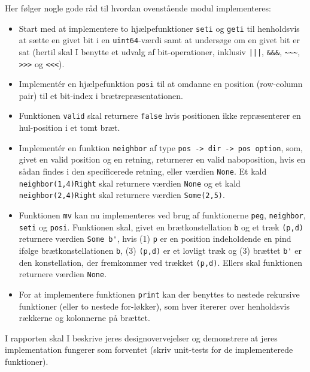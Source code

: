 Her følger nogle gode råd til hvordan ovenstående modul implementeres:
\begin{itemize}

\item Start med at implementere to hjælpefunktioner \lstinline{seti} og \lstinline{geti} til henholdsvis at sætte en givet bit i en \lstinline{uint64}-værdi samt at undersøge om en givet bit er sat (hertil skal I benytte et udvalg af bit-operationer, inklusiv \lstinline{|||}, \lstinline{&&&}, \lstinline{~~~}, \lstinline{>>>} og \lstinline{<<<}).

\item Implementér en hjælpefunktion \lstinline{posi} til at omdanne en position (row-column pair) til et bit-index i brætrepræsentationen.

\item Funktionen \lstinline{valid} skal returnere \lstinline{false} hvis positionen ikke repræsenterer en hul-position i et tomt bræt.
\item Implementér en funktion \lstinline{neighbor} af type \lstinline{pos -> dir -> pos option}, som, givet en valid position og en retning, returnerer en valid naboposition, hvis en sådan findes i den specificerede retning, eller værdien \lstinline{None}. Et kald \lstinline{neighbor(1,4)Right} skal returnere værdien \lstinline{None} og et kald \lstinline{neighbor(2,4)Right} skal returnere værdien \lstinline{Some(2,5)}.
\item Funktionen \lstinline{mv} kan nu implementeres ved brug af funktionerne \lstinline{peg}, \lstinline{neighbor}, \lstinline{seti} og \lstinline{posi}. Funktionen skal, givet en brætkonstellation \lstinline{b} og et træk \lstinline{(p,d)} returnere værdien \lstinline{Some b'}, hvis (1) \lstinline{p} er en position indeholdende en pind ifølge brætkonstellationen \lstinline{b}, (3) \lstinline{(p,d)} er et lovligt træk og (3) brættet \lstinline{b'} er den konstellation, der fremkommer ved trækket \lstinline{(p,d)}. Ellers skal funktionen returnere værdien \lstinline{None}.
\item For at implementere funktionen \lstinline{print} kan der benyttes to nestede rekursive funktioner (eller to nestede for-løkker), som hver itererer over henholdsvis rækkerne og kolonnerne på brættet.
\end{itemize}

I rapporten skal I beskrive jeres designovervejelser og demonstrere at
jeres implementation fungerer som forventet (skriv unit-tests for de
implementerede funktioner).
